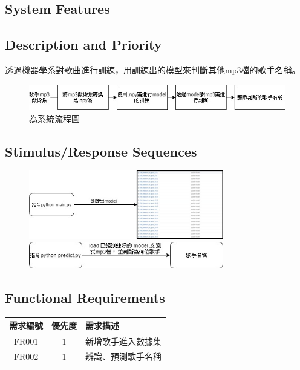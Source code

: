 \documentclass{article}
\begin{document}
\begin{CJK}{UTF8}{bkai}
\newpage



\section{\huge\bf \color{blue}  System Features }
\subsection{\Large Description and Priority }
	
	透過機器學系對歌曲進行訓練，用訓練出的模型來判斷其他mp3檔的歌手名稱。
\begin{figure}[h]
\begin{center}
\includegraphics[width=14cm]{FS.jpg}
\end{center}
\caption{為系統流程圖}
\label{fig:2}
\end{figure}

\subsection{\Large Stimulus/Response Sequences}
\begin{figure}[h]
\begin{center}
\includegraphics[width=8.5cm]{sti.jpg}
\newline
\newline
\newline
\includegraphics[width=8.5cm]{ss.jpg}
\end{center}
\label{fig:1}
\end{figure}

\subsection{ \Large Functional Requirements}
 \begin{center}
	\begin{tabular}{|c|c|p{8cm}|}\hline
		需求編號 & 優先度 & 需求描述 \\ \hline
		FR001 & 1 & 新增歌手進入數據集 \\ \hline
		FR002 & 1 &  辨識、預測歌手名稱\\\hline
	\end{tabular}
\end{center}


\end{CJK}
\end{document}
